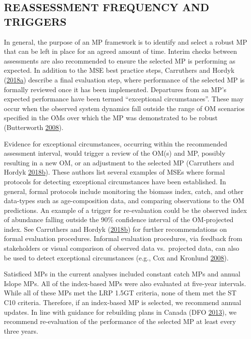 \documentclass[11pt]{book}
\begin{document}
\hypertarget{sec:discussion-triggers}{%
\subsection{REASSESSMENT FREQUENCY AND TRIGGERS}\label{sec:discussion-triggers}}

In general, the purpose of an MP framework is to identify and select a robust MP that can be left in place for an agreed amount of time. Interim checks between assessments are also recommended to ensure the selected MP is performing as expected. In addition to the MSE best practice steps, Carruthers and Hordyk (\protect\hyperlink{ref-carruthers2018}{2018}\protect\hyperlink{ref-carruthers2018}{a}) describe a final evaluation step, where performance of the selected MP is formally reviewed once it has been implemented. Departures from an MP's expected performance have been termed ``exceptional circumstances''. These may occur when the observed system dynamics fall outside the range of OM scenarios specified in the OMs over which the MP was demonstrated to be robust (Butterworth \protect\hyperlink{ref-butterworth2008}{2008}).

Evidence for exceptional circumstances, occurring within the recommended assessment interval, would trigger a review of the OM(s) and MP, possibly resulting in a new OM, or an adjustment to the selected MP (Carruthers and Hordyk \protect\hyperlink{ref-carruthers_hordyk_2018}{2018}\protect\hyperlink{ref-carruthers_hordyk_2018}{b}). These authors list several examples of MSEs where formal protocols for detecting exceptional circumstances have been established. In general, formal protocols include monitoring the biomass index, catch, and other data-types such as age-composition data, and comparing observations to the OM predictions. An example of a trigger for re-evaluation could be the observed index of abundance falling outside the 90\% confidence interval of the OM-projected index. See Carruthers and Hordyk (\protect\hyperlink{ref-carruthers_hordyk_2018}{2018}\protect\hyperlink{ref-carruthers_hordyk_2018}{b}) for further recommendations on formal evaluation procedures. Informal evaluation procedures, via feedback from stakeholders or visual comparison of observed data vs.~projected data, can also be used to detect exceptional circumstances (e.g., Cox and Kronlund \protect\hyperlink{ref-cox2008a}{2008}).

Satisficed MPs in the current analyses included constant catch MPs and annual Islope MPs. All of the index-based MPs were also evaluated at five-year intervals. While all of these MPs met the LRP 1.5GT criteria, none of them met the ST C10 criteria. Therefore, if an index-based MP is selected, we recommend annual updates. In line with guidance for rebuilding plans in Canada (DFO \protect\hyperlink{ref-dfo2013}{2013}), we recommend re-evaluation of the performance of the selected MP at least every three years.
\end{document}
